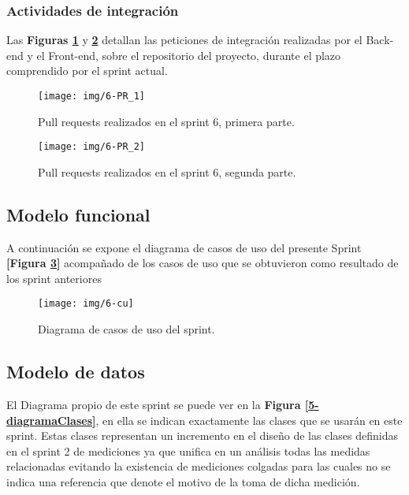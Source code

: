 \subsubsection{Actividades de integración}

Las \textbf{Figuras \ref{6-PR_1}} y \textbf{\ref{6-PR_2}} detallan las peticiones de integración realizadas por el Back-end y el Front-end, sobre el repositorio del proyecto, durante el plazo comprendido por el sprint actual.

\begin{figure}[h!]
	\centering
	\texttt{[image: img/6-PR\_1]}
	\caption{Pull requests realizados en el sprint 6, primera parte.}
	\label{6-PR_1}
\end{figure}

\begin{figure}[h!]
	\centering
	\texttt{[image: img/6-PR\_2]}
	\caption{Pull requests realizados en el sprint 6, segunda parte.}
	\label{6-PR_2}
\end{figure}
\clearpage

\subsection{Modelo funcional} %
A continuación se expone el diagrama de casos de uso del presente Sprint \textbf{[Figura \ref{6-cu}]} acompañado de los casos de uso que se obtuvieron como resultado de los sprint anteriores

\clearpage

\begin{figure}[h]
	\centering
	\texttt{[image: img/6-cu]}
	\caption{Diagrama de casos de uso del sprint.}
	\label{6-cu}
\end{figure}



\subsection{Modelo de datos}
El Diagrama propio de este sprint se puede ver en la \textbf{Figura \ref{5-diagramaClases}}, en ella se indican exactamente las clases que se usarán en este sprint. Estas clases representan un incremento en el diseño de las clases definidas en el sprint 2 de mediciones ya que unifica en un análisis todas las medidas relacionadas evitando la existencia de mediciones colgadas para las cuales no se indica una referencia que denote el motivo de la toma de dicha medición.

